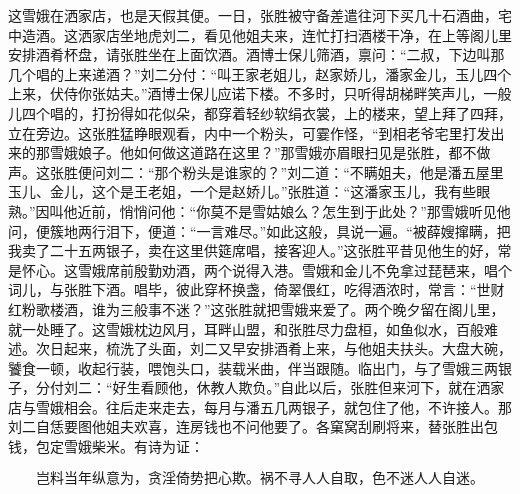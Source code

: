这雪娥在洒家店，也是天假其便。一日，张胜被守备差遣往河下买几十石酒曲，宅中造酒。这洒家店坐地虎刘二，看见他姐夫来，连忙打扫酒楼干净，在上等阁儿里安排酒肴杯盘，请张胜坐在上面饮酒。酒博士保儿筛酒，禀问：“二叔，下边叫那几个唱的上来递酒？”刘二分付：“叫王家老姐儿，赵家娇儿，潘家金儿，玉儿四个上来，伏侍你张姑夫。”酒博士保儿应诺下楼。不多时，只听得胡梯畔笑声儿，一般儿四个唱的，打扮得如花似朵，都穿着轻纱软绢衣裳，上的楼来，望上拜了四拜，立在旁边。这张胜猛睁眼观看，内中一个粉头，可霎作怪，“到相老爷宅里打发出来的那雪娥娘子。他如何做这道路在这里？”那雪娥亦眉眼扫见是张胜，都不做声。这张胜便问刘二：“那个粉头是谁家的？”刘二道：“不瞒姐夫，他是潘五屋里玉儿、金儿，这个是王老姐，一个是赵娇儿。”张胜道：“这潘家玉儿，我有些眼熟。”因叫他近前，悄悄问他：“你莫不是雪姑娘么？怎生到于此处？”那雪娥听见他问，便簇地两行泪下，便道：“一言难尽。”如此这般，具说一遍。“被薛嫂撺瞒，把我卖了二十五两银子，卖在这里供筵席唱，接客迎人。”这张胜平昔见他生的好，常是怀心。这雪娥席前殷勤劝酒，两个说得入港。雪娥和金儿不免拿过琵琶来，唱个词儿，与张胜下酒。唱毕，彼此穿杯换盏，倚翠偎红，吃得酒浓时，常言：“世财红粉歌楼酒，谁为三般事不迷？”这张胜就把雪娥来爱了。两个晚夕留在阁儿里，就一处睡了。这雪娥枕边风月，耳畔山盟，和张胜尽力盘桓，如鱼似水，百般难述。次日起来，梳洗了头面，刘二又早安排酒肴上来，与他姐夫扶头。大盘大碗，饕食一顿，收起行装，喂饱头口，装载米曲，伴当跟随。临出门，与了雪娥三两银子，分付刘二：“好生看顾他，休教人欺负。”自此以后，张胜但来河下，就在洒家店与雪娥相会。往后走来走去，每月与潘五几两银子，就包住了他，不许接人。那刘二自恁要图他姐夫欢喜，连房钱也不问他要了。各窠窝刮刷将来，替张胜出包钱，包定雪娥柴米。有诗为证：

\[
岂料当年纵意为，贪淫倚势把心欺。
祸不寻人人自取，色不迷人人自迷。
\]
